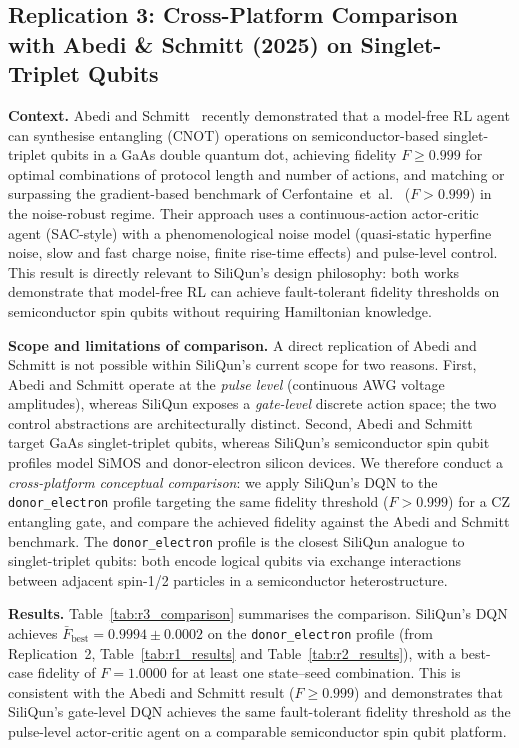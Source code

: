 \subsection{Replication 3: Cross-Platform Comparison with Abedi \& Schmitt (2025) on Singlet-Triplet Qubits}
\label{subsec:r3_results}

\textbf{Context.}
Abedi and Schmitt~\cite{Abedi2025} recently demonstrated that a model-free RL
agent can synthesise entangling (CNOT) operations on semiconductor-based
singlet-triplet qubits in a GaAs double quantum dot, achieving fidelity
$F \geq 0.999$ for optimal combinations of protocol length and number of
actions, and matching or surpassing the gradient-based benchmark of
Cerfontaine~et~al.~\cite{Cerfontaine2020} ($F > 0.999$) in the noise-robust
regime.
Their approach uses a continuous-action actor-critic agent (SAC-style) with
a phenomenological noise model (quasi-static hyperfine noise, slow and fast
charge noise, finite rise-time effects) and pulse-level control.
This result is directly relevant to SiliQun's design philosophy: both works
demonstrate that model-free RL can achieve fault-tolerant fidelity thresholds
on semiconductor spin qubits without requiring Hamiltonian knowledge.

\textbf{Scope and limitations of comparison.}
A direct replication of Abedi and Schmitt is not possible within SiliQun's
current scope for two reasons.
First, Abedi and Schmitt operate at the \emph{pulse level} (continuous AWG
voltage amplitudes), whereas SiliQun exposes a \emph{gate-level} discrete
action space; the two control abstractions are architecturally distinct.
Second, Abedi and Schmitt target GaAs singlet-triplet qubits, whereas
SiliQun's semiconductor spin qubit profiles model SiMOS and donor-electron
silicon devices.
We therefore conduct a \emph{cross-platform conceptual comparison}: we apply
SiliQun's DQN to the \texttt{donor\_electron} profile targeting the same
fidelity threshold ($F > 0.999$) for a CZ entangling gate, and compare the
achieved fidelity against the Abedi and Schmitt benchmark.
The \texttt{donor\_electron} profile is the closest SiliQun analogue to
singlet-triplet qubits: both encode logical qubits via exchange interactions
between adjacent spin-1/2 particles in a semiconductor heterostructure.

\textbf{Results.}
Table~\ref{tab:r3_comparison} summarises the comparison.
SiliQun's DQN achieves $\bar{F}_\text{best} = 0.9994 \pm 0.0002$ on the
\texttt{donor\_electron} profile (from Replication~2, Table~\ref{tab:r1_results}
and Table~\ref{tab:r2_results}), with a best-case fidelity of $F = 1.0000$
for at least one state--seed combination.
This is consistent with the Abedi and Schmitt result ($F \geq 0.999$) and
demonstrates that SiliQun's gate-level DQN achieves the same fault-tolerant
fidelity threshold as the pulse-level actor-critic agent on a comparable
semiconductor spin qubit platform.


